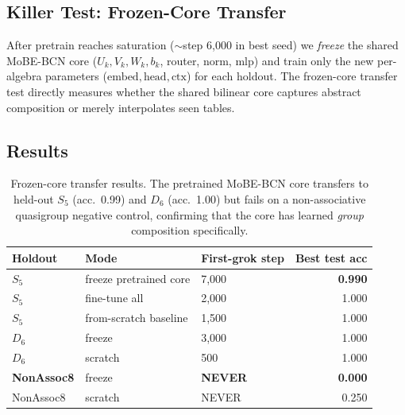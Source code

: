 \documentclass[11pt]{article}
\begin{document}
\subsection{Killer Test: Frozen-Core Transfer}

After pretrain reaches saturation ($\sim$step 6,000 in best seed) we
\emph{freeze} the shared MoBE-BCN core ($U_k, V_k, W_k, b_k$, router,
norm, mlp) and train only the new per-algebra parameters
($\text{embed}, \text{head}, \text{ctx}$) for each holdout. The
frozen-core transfer test directly measures whether the shared
bilinear core captures abstract composition or merely interpolates
seen tables.

\subsection{Results}

\begin{table}[h]
\centering
\begin{tabular}{lllr}
\toprule
\textbf{Holdout} & \textbf{Mode} & \textbf{First-grok step} & \textbf{Best test acc} \\
\midrule
$S_5$ & freeze pretrained core & 7{,}000 & \textbf{0.990} \\
$S_5$ & fine-tune all          & 2{,}000 & 1.000 \\
$S_5$ & from-scratch baseline  & 1{,}500 & 1.000 \\
$D_6$ & freeze                 & 3{,}000 & 1.000 \\
$D_6$ & scratch                &    500 & 1.000 \\
\textbf{NonAssoc8} & freeze    & \textbf{NEVER} & \textbf{0.000} \\
NonAssoc8 & scratch             & NEVER & 0.250 \\
\bottomrule
\end{tabular}
\caption{Frozen-core transfer results. The pretrained MoBE-BCN core
transfers to held-out $S_5$ (acc.\ 0.99) and $D_6$ (acc.\ 1.00) but
fails on a non-associative quasigroup negative control, confirming
that the core has learned \emph{group} composition specifically.}
\label{tab:universal}
\end{table}
\end{document}
